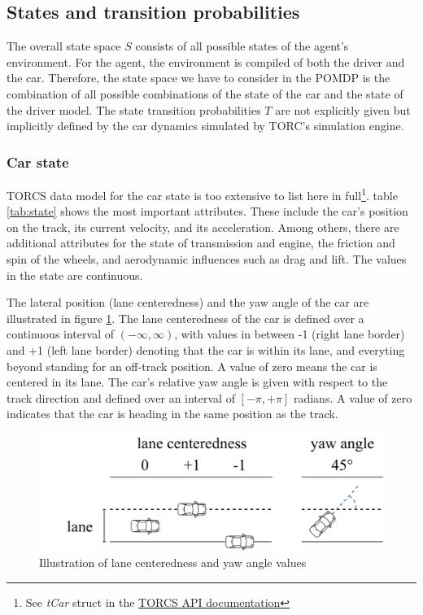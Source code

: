 \subsection{States and transition probabilities}

The overall state space $S$ consists of all possible states of the agent's environment. For the agent, the environment is compiled of both the driver and the car. Therefore, the state space we have to consider in the POMDP is the combination of all possible combinations of the state of the car and the state of the driver model. The state transition probabilities $T$ are not explicitly given but implicitly defined by the car dynamics simulated by TORC's simulation engine.

\subsubsection*{Car state}
\label{sec:state}

TORCS data model for the car state is too extensive to list here in full\footnote{See \emph{tCar} struct in the \href{https://sourceforge.net/projects/torcs/files/api-docs/}{TORCS API documentation}}. table \ref{tab:state} shows the most important attributes. These include the car's position on the track, its current velocity, and its acceleration. Among others, there are additional attributes for the state of transmission and engine, the friction and spin of the wheels, and aerodynamic influences such as drag and lift. The values in the state are continuous. 



\noindent
The lateral position (lane centeredness) and the yaw angle of the car are illustrated in figure \ref{fig:observations}. The lane centeredness of the car is defined over a continuous interval of $(-\infty,\infty)$, with values in between -1 (right lane border) and +1 (left lane border) denoting that the car is within its lane, and everyting beyond standing for an off-track position. A value of zero means the car is centered in its lane. The car's relative yaw angle is given with respect to the track direction and defined over an interval of $[-\pi, +\pi]$ radians. A value of zero indicates that the car is heading in the same position as the track.

\begin{figure}[htbp]
    \includegraphics[width=0.6\linewidth]{figures/angle_distance.pdf}
    \centering
    \caption{Illustration of lane centeredness and yaw angle values}
    \label{fig:observations}
\end{figure}

